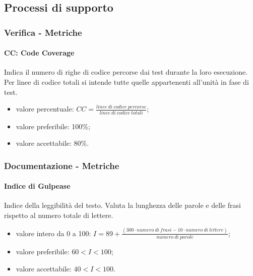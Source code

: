	\subsection{Processi di supporto}
		\subsubsection{Verifica - Metriche}
		\paragraph{CC: Code Coverage}
		Indica il numero di righe di codice percorse dai test durante la loro esecuzione. Per linee di codice totali si intende tutte quelle appartenenti all'unità in fase di test.
		\begin{itemize}
		\item valore percentuale: $CC = \frac{linee \ di \ codice \ percorse}{linee \ di \ codice \ totali}$;
		\item valore preferibile: 100\%;
		\item valore accettabile: 80\%.
		\end{itemize}
		
		\subsubsection{Documentazione - Metriche}
		\paragraph{Indice di Gulpease}
		Indice della leggibilità del testo. Valuta la lunghezza delle parole e delle frasi rispetto al numero totale di lettere.
		\begin{itemize}
		\item valore intero da 0 a 100: $I = 89 + \frac{(300 \cdot numero \ di \ frasi - 10 \cdot numero \ di \ lettere)}{numero \ di \ parole}$;
		\item valore preferibile: $60 < I < 100$;
		\item valore accettabile: $40 < I < 100$.
		\end{itemize}
		
		\newpage
		\setcounter{table}{0}
